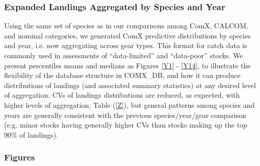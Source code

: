 \documentclass[12pt]{article}
\begin{document}
\subsubsection{Expanded Landings Aggregated by Species and Year}

Using the same set of species as in our comparisons among ComX, CALCOM, and 
nominal categories, we generated ComX predictive distributions by species and 
year, i.e. now aggregating across gear types. This format for catch data is 
commonly used in assessments of “data-limited” and “data-poor” stocks. We 
present percentiles means and medians as Figures \ref{Y1} - \ref{Y14}, to illustrate the 
flexibility of the database structure in COMX\_DB, and how it can produce 
distributions of landings (and associated summary statistics) at any desired 
level of aggregation. CVs of landings distributions are reduced, as expected, 
with higher levels of aggregation, Table (\ref{Z}), but general patterns among 
species and years are generally consistent with the previous species/year/gear 
comparison (e.g. minor stocks having generally higher CVs than stocks making 
up the top 90\% of landings).

\subsubsection{Figures}

%
\clearpage
%
\end{document}
